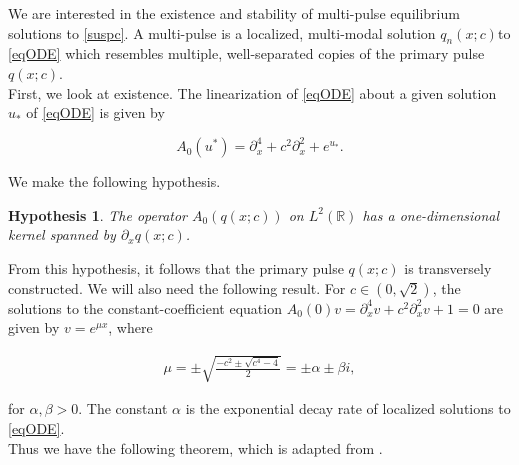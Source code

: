 \documentclass[12pt]{article}
\def\R{{\mathbb R}}
\newtheorem{hypothesis}{Hypothesis}
\begin{document}
We are interested in the existence and stability of multi-pulse equilibrium solutions to \eqref{suspc}. A multi-pulse is a localized, multi-modal solution $q_n(x; c) $to \eqref{eqODE} which resembles multiple, well-separated copies of the primary pulse $q(x; c)$. \\

First, we look at existence. The linearization of \eqref{eqODE} about a given solution $u_*$ of \eqref{eqODE} is given by 

\begin{equation}\label{defA0}
A_0(u^*) = \partial_x^4 + c^2 \partial_x^2 + e^{u_*}.
\end{equation}

We make the following hypothesis.

\begin{hypothesis}\label{A0kernel}
The operator $A_0(q(x; c))$ on $L^2(\R)$ has a one-dimensional kernel spanned by $\partial_x q(x; c)$.
\end{hypothesis}

From this hypothesis, it follows that the primary pulse $q(x; c)$ is transversely constructed. We will also need the following result. For $c \in (0, \sqrt{2})$, the solutions to the constant-coefficient equation $A_0(0)v = \partial_x^4 v + c^2 \partial_x^2 v + 1 = 0$ are given by $v = e^{\mu x}$, where

\begin{align}\label{specA00}
\mu = \pm \sqrt{\frac{-c^2 \pm \sqrt{c^4 - 4}}{2} } = \pm \alpha \pm \beta i,
\end{align}

for $\alpha, \beta > 0$. The constant $\alpha$ is the exponential decay rate of localized solutions to \eqref{eqODE}.\\

Thus we have the following theorem, which is adapted from \cite[Theorem 3.6]{Sandstede1997}.
\end{document}
